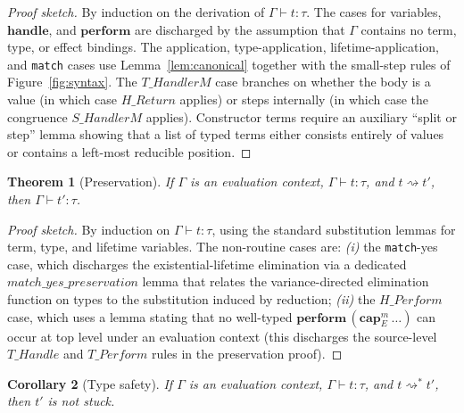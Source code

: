 \documentclass[12pt,a4paper]{article}
\newtheorem{theorem}{Theorem}
\newtheorem{corollary}[theorem]{Corollary}
\newcommand{\keyword}[1]{\mathbf{#1}}
\begin{document}
    \begin{proof}[Proof sketch]
        By induction on the derivation of $\Gamma \vdash t : \tau$.
        The cases for variables, $\keyword{handle}$, and $\keyword{perform}$ are
        discharged by the assumption that $\Gamma$ contains no term, type, or
        effect bindings.
        The application, type-application, lifetime-application, and \texttt{match}
        cases use Lemma~\ref{lem:canonical} together with the small-step rules of
        Figure~\ref{fig:syntax}.
        The $T\!\_HandlerM$ case branches on whether the body is a value
        (in which case $H\!\_Return$ applies) or steps internally
        (in which case the congruence $S\!\_HandlerM$ applies).
        Constructor terms require an auxiliary ``split or step'' lemma showing
        that a list of typed terms either consists entirely of values or contains
        a left-most reducible position.
    \end{proof}

    \begin{theorem}[Preservation]\label{thm:preservation}
        If $\Gamma$ is an evaluation context, $\Gamma \vdash t : \tau$, and
        $t \rightsquigarrow t'$, then $\Gamma \vdash t' : \tau$.
    \end{theorem}

    \begin{proof}[Proof sketch]
        By induction on $\Gamma \vdash t : \tau$, using the standard substitution
        lemmas for term, type, and lifetime variables.
        The non-routine cases are:
        \emph{(i)} the \texttt{match}-yes case, which discharges the
        existential-lifetime elimination via a dedicated
        $\mathit{match\_yes\_preservation}$ lemma that relates the variance-directed
        elimination function on types to the substitution induced by reduction;
        \emph{(ii)} the $H\!\_Perform$ case, which uses a lemma stating that no
        well-typed $\keyword{perform}\,(\keyword{cap}_E^m\,\ldots)$ can occur at top
        level under an evaluation context (this discharges the source-level
        $T\!\_Handle$ and $T\!\_Perform$ rules in the preservation proof).
    \end{proof}

    \begin{corollary}[Type safety]\label{cor:safety}
        If $\Gamma$ is an evaluation context, $\Gamma \vdash t : \tau$, and
        $t \rightsquigarrow^{*} t'$, then $t'$ is not stuck.
    \end{corollary}
\end{document}
